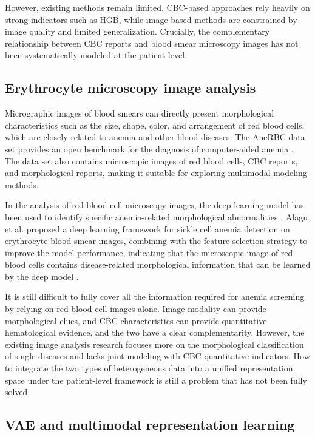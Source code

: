 \documentclass[conference]{IEEEtran}
\begin{document}
However, existing methods remain limited. CBC-based approaches rely heavily on strong indicators such as HGB, while image-based methods are constrained by image quality and limited generalization. Crucially, the complementary relationship between CBC reports and blood smear microscopy images has not been systematically modeled at the patient level.

\subsection{Erythrocyte microscopy image analysis}

Micrographic images of blood smears can directly present morphological characteristics such as the size, shape, color, and arrangement of red blood cells, which are closely related to anemia and other blood diseases. The AneRBC data set provides an open benchmark for the diagnosis of computer-aided anemia \cite{ref3}. The data set also contains microscopic images of red blood cells, CBC reports, and morphological reports, making it suitable for exploring multimodal modeling methods.

In the analysis of red blood cell microscopy images, the deep learning model has been used to identify specific anemia-related morphological abnormalities \cite{ref6}. Alagu et al. proposed a deep learning framework for sickle cell anemia detection on erythrocyte blood smear images, combining with the feature selection strategy to improve the model performance, indicating that the microscopic image of red blood cells contains disease-related morphological information that can be learned by the deep model \cite{ref7}.

It is still difficult to fully cover all the information required for anemia screening by relying on red blood cell images alone. Image modality can provide morphological clues, and CBC characteristics can provide quantitative hematological evidence, and the two have a clear complementarity. However, the existing image analysis research focuses more on the morphological classification of single diseases and lacks joint modeling with CBC quantitative indicators. How to integrate the two types of heterogeneous data into a unified representation space under the patient-level framework is still a problem that has not been fully solved.

\subsection{VAE and multimodal representation learning}
\end{document}

